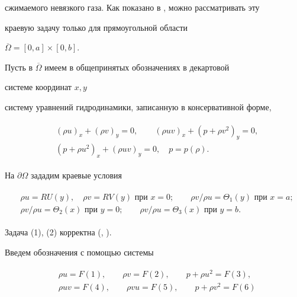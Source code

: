 сжимаемого невязкого газа. Как показано в \cite{Deg}, можно рассматривать эту 


краевую задачу только для прямоугольной области 


$\overline\Omega=[0,a]\times[0,b]$. 


 


Пусть в $\overline\Omega$ имеем в общепринятых обозначениях в декартовой 


системе координат $x,y$ 


систему уравнений гидродинамики, записанную в консервативной форме, 


\begin{align} 


\begin{split} 


&(\rho u)_x+(\rho v)_y=0,\qquad (\rho uv)_x+(p+\rho v^2)_y=0,\\ 


&(p+\rho u^2)_x+(\rho uv)_y=0,\quad p=p(\rho). 


\end{split} 


\end{align} 


На $\partial\Omega$ зададим краевые условия 


\begin{align} 


\begin{split} 


&\rho u=RU(y),\quad \rho v=RV(y)\text{ при }x=0;\qquad 


 \rho v/\rho u=\Theta_1(y)\text{ при }x=a;\\ 


&\rho v/\rho u=\Theta_2(x)\text{ при }y=0;\qquad 


 \rho v/\rho u=\Theta_3(x)\text{ при }y=b. 


\end{split} 


\end{align} 


Задача (1), (2) корректна (\cite{Ry1}, \cite{Ry2}). 


 


Введем обозначения с помощью системы 


\begin{align} 


\begin{split} 


&\rho u=F(1),\qquad \rho v=F(2),\qquad p+\rho u^2=F(3),\\ 


&\rho uv=F(4),\qquad \rho vu=F(5),\qquad p+\rho v^2=F(6) 


\end{split} 


\end{align} 


